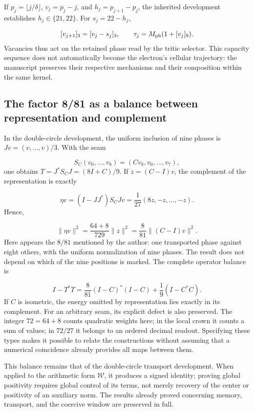 If \(p_j=\lfloor j/\delta\rfloor\), \(v_j=p_j-j\), and \(h_j=p_{j+1}-p_j\), the inherited development establishes \(h_j\in\{21,22\}\). For \(s_j=22-h_j\),

\[
[v_{j+1}]_3=[v_j-s_j]_3,\qquad
\tau_j=M_{\rm ph}(1+[v_j]_9).
\]
Vacancies thus act on the retained phase read by the tritic selector. This capacity sequence does not automatically become the electron's cellular trajectory: the manuscript preserves their respective mechanisms and their composition within the same kernel.



\subsection{The factor 8/81 as a balance between representation and complement}
In the double-circle development, the uniform inclusion of nine phases is \(Jv=(v,\ldots,v)/3\). With the seam

\[
S_C(v_0,\ldots,v_8)=(Cv_8,v_0,\ldots,v_7),
\]
one obtains \(T=J^*S_CJ=(8I+C)/9\). If \(z=(C-I)v\), the complement of the representation is exactly

\[
\eta v=(I-JJ^*)S_CJv=\frac1{27}(8z,-z,\ldots,-z).
\]
Hence,

\[
\|\eta v\|^2=\frac{64+8}{729}\|z\|^2
=\frac8{81}\|(C-I)v\|^2.
\]
Here appears the \(8/81\) mentioned by the author: one transported phase against eight others, with the uniform normalization of nine phases. The result does not depend on which of the nine positions is marked. The complete operator balance is

\[
I-T^*T=\frac8{81}(I-C)^*(I-C)+\frac19(I-C^*C).
\]
If \(C\) is isometric, the energy omitted by representation lies exactly in its complement. For an arbitrary seam, its explicit defect is also preserved. The integer \(72=64+8\) counts quadratic weights here; in the local crown it counts a sum of values; in \(72/27\) it belongs to an ordered decimal readout. Specifying these types makes it possible to relate the constructions without assuming that a numerical coincidence already provides all maps between them.

This balance remains that of the double-circle transport development. When applied to the arithmetic form \(\mathscr W\), it produces a signed identity; proving global positivity requires global control of its terms, not merely recovery of the center or positivity of an auxiliary norm. The results already proved concerning memory, transport, and the coercive window are preserved in full.
